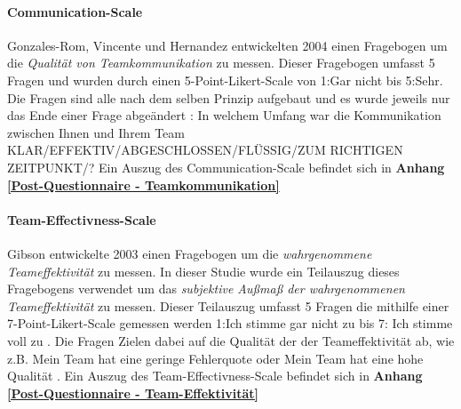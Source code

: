 \documentclass[a4paper,11pt]{article}%
\renewcommand{\\}{\vspace*{0.5\baselineskip} \newline}
\begin{document}
		\paragraph{Communication-Scale}
Gonzales-Rom, Vincente und Hernandez \citep[p.1049]{gonzalez2014climate} entwickelten 2004 einen Fragebogen um die  \textit{Qualität von Teamkommunikation} zu messen. Dieser Fragebogen umfasst 5 Fragen und wurden durch einen 5-Point-Likert-Scale von \dq{}1:Gar nicht\dq{} bis \dq{}5:Sehr\dq{}. Die Fragen sind alle nach dem selben Prinzip aufgebaut und es wurde jeweils nur das Ende einer Frage abgeändert : \dq{}In welchem Umfang war die Kommunikation zwischen Ihnen und Ihrem Team KLAR/EFFEKTIV/ABGESCHLOSSEN/FLÜSSIG/ZUM RICHTIGEN ZEITPUNKT/?\dq{} 
Ein Auszug des Communication-Scale befindet sich in \textbf{Anhang \ref{Post-Questionnaire - Teamkommunikation}}

		\paragraph{Team-Effectivness-Scale}
Gibson \citep[p.469]{gibson2003team} entwickelte 2003 einen Fragebogen um die \textit{wahrgenommene Teameffektivität} zu messen. In dieser Studie wurde ein Teilauszug dieses Fragebogens verwendet um das \textit{subjektive Außmaß der wahrgenommenen Teameffektivität} zu messen. Dieser Teilauszug umfasst 5 Fragen die mithilfe einer 7-Point-Likert-Scale gemessen werden \dq{}1:Ich stimme gar nicht zu \dq{} bis \dq{}7: Ich stimme voll zu \dq{}. Die Fragen Zielen dabei auf die Qualität der der Teameffektivität ab, wie z.B. \dq{}Mein Team hat eine geringe Fehlerquote \dq{} oder \dq{}Mein Team hat eine hohe Qualität \dq{}. 
Ein Auszug des Team-Effectivness-Scale befindet sich in \textbf{Anhang \ref{Post-Questionnaire - Team-Effektivität}}

\end{document}
